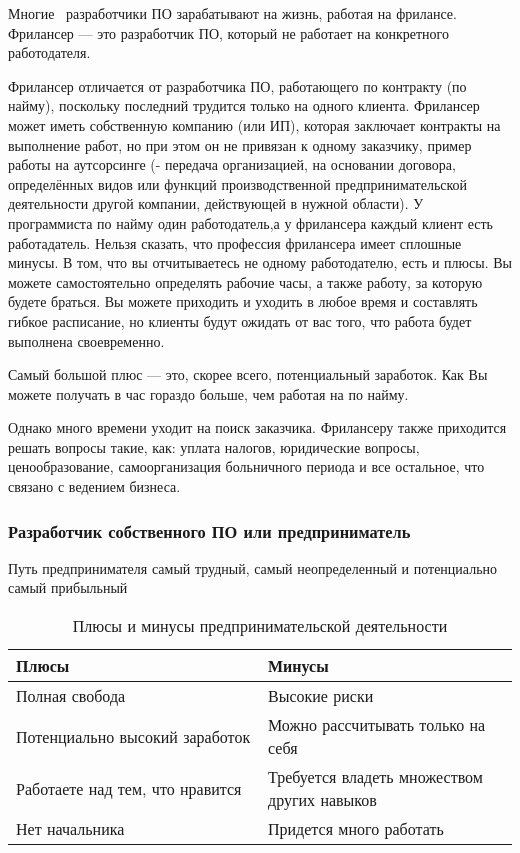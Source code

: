 \documentclass{../industrial-development}
\begin{document}
\lecturenotes

Многие~\cite[с.~62--67]{Sonmez} разработчики ПО зарабатывают на жизнь, работая на фрилансе. Фрилансер — это разработчик ПО, который не работает на конкретного работодателя.

 Фрилансер отличается от разработчика ПО, работающего по контракту (по найму), поскольку последний трудится только на одного клиента. Фрилансер может иметь собственную компанию (или ИП), которая заключает контракты на выполнение работ, но при этом он не привязан к одному заказчику, пример работы на аутсорсинге (- передача организацией, на основании договора, определённых видов или функций производственной предпринимательской деятельности другой компании, действующей в нужной области).
У программиста по найму один работодатель,а у фрилансера каждый клиент есть работадатель.
Нельзя сказать, что профессия фрилансера имеет сплошные минусы. В том, что вы отчитываетесь не одному работодателю, есть и плюсы. Вы можете самостоятельно определять рабочие часы, а также работу, за которую будете браться. Вы можете приходить и уходить в любое время и составлять гибкое расписание, но клиенты будут ожидать от вас того, что работа будет выполнена своевременно.

Самый большой плюс — это, скорее всего, потенциальный заработок. Как Вы можете получать в час гораздо больше, чем работая на по найму. 

Однако много времени уходит на поиск заказчика. Фрилансеру также приходится решать вопросы такие, как: уплата налогов, юридические вопросы, ценообразование, самоорганизация больничного периода и все остальное, что связано с ведением бизнеса.


\begin{frame} \frametitle{Разработчик собственного ПО или предприниматель}
  \begin{block}{}
 Путь предпринимателя самый трудный, самый неопределенный и потенциально самый прибыльный
  \end{block}
  
  \begin{table}[H]
\caption{\label{tab:canonsummary} Плюсы и минусы предпринимательской деятельности }
\begin{center}
\begin{tabular}{|p{0.5\linewidth}|p{0.5\linewidth}|}
\hline
\textbf{Плюсы} & \textbf{Минусы} \\
\hline
Полная свобода &  Высокие риски \\
\hline
Потенциально высокий заработок  & Можно рассчитывать только на себя \\
\hline
Работаете над тем, что нравится & Требуется владеть множеством других навыков \\
\hline
Нет начальника  & Придется много работать \\
\hline
\end{tabular}
\end{center}
\end{table} 

\end{frame}
\end{document}
